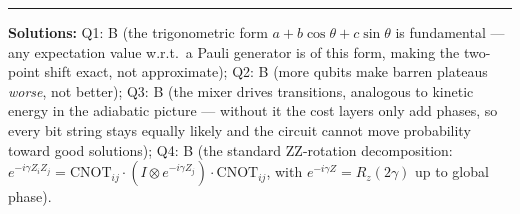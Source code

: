 \documentclass[a4paper,11pt]{article}
\begin{document}
\vspace{1cm}
\hrule
\vspace{0.2cm}
\footnotesize{%
\textbf{Solutions:}
Q1: B (the trigonometric form $a + b\cos\theta + c\sin\theta$ is
    fundamental — any expectation value w.r.t.\ a Pauli generator is
    of this form, making the two-point shift exact, not approximate);
Q2: B (more qubits make barren plateaus \emph{worse}, not better);
Q3: B (the mixer drives transitions, analogous to kinetic energy in
    the adiabatic picture — without it the cost layers only add phases,
    so every bit string stays equally likely and the circuit cannot move
    probability toward good solutions);
Q4: B (the standard ZZ-rotation decomposition:
    $e^{-i\gamma Z_i Z_j} = \mathrm{CNOT}_{ij}
    \cdot(I\otimes e^{-i\gamma Z_j})\cdot \mathrm{CNOT}_{ij}$,
    with $e^{-i\gamma Z} = R_z(2\gamma)$ up to global phase).
}
\end{document}
